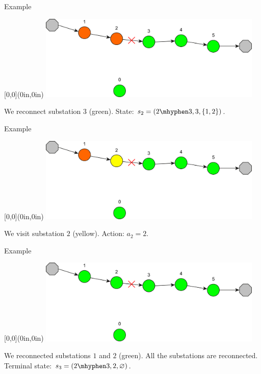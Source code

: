 \documentclass[10pt, aspectratio=169, compress, protectframetitle, handout]{beamer}
\begin{document}
\begin{frame}{Example}

    \begin{textblock*}{\textwidth}[0,0](0in,0in)
        \centering
        \includegraphics[width=0.8\textwidth]{figures/MDP_4.pdf}
    \end{textblock*}
    
    \vspace*{5cm}
    We reconnect substation $3$ (green). State: $s_2 = (2 \mhyphen 3, 3, \{1,2\})$.
    
\end{frame}

\begin{frame}{Example}

    \begin{textblock*}{\textwidth}[0,0](0in,0in)
        \centering
        \includegraphics[width=0.8\textwidth]{figures/MDP_5.pdf}
    \end{textblock*}
    
    \vspace*{5cm}
    We visit substation $2$ (yellow). Action: $a_2 = 2$.
    
\end{frame}

\begin{frame}{Example}

    \begin{textblock*}{\textwidth}[0,0](0in,0in)
        \centering
        \includegraphics[width=0.8\textwidth]{figures/MDP_6.pdf}
    \end{textblock*}
    
    \vspace*{5cm}
    We reconnected substations $1$ and $2$ (green). All the substations are reconnected. Terminal state: $s_3 = (2 \mhyphen 3, 2, \varnothing)$.
    
\end{frame}
\end{document}
